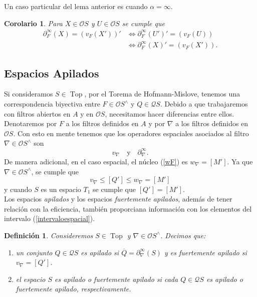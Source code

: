 \documentclass[12pt]{article}
\newtheorem{dfn}[thm]{Definición}
\newtheorem{cor}[thm]{Corolario}
\DeclareMathOperator{\Top}{Top}
\begin{document}
Un caso particular del lema anterior es cuando $\alpha=\infty$.
\begin{cor}\label{cor:infinito}
Para $X\in \mathcal{O}S$ y $U\in \mathcal{O}S$ se cumple que
\begin{equation}\label{eq:infinito}
    \begin{split}
\partial_F^\infty(X)=(v_F(X'))' & \iff \partial_F^\infty(U')'=(v_F(U))\\
& \iff \partial_F^\infty(X)'=(v_F(X')).
    \end{split}
\end{equation}
\end{cor}


\subsection{Espacios Apilados}
Si consideramos $S\in \Top$, por el Torema de Hofmann-Mislove, tenemos una correspondencia biyectiva entre 
$F\in \mathcal{O}S^\wedge$ y $Q\in \mathcal{Q}S$. Debido a que trabajaremos con filtros 
abiertos en $A$ y en $\mathcal{O}S$, necesitamos hacer diferencias entre ellos.\\ 

Denotaremos por $F$ a los filtros definidos en $A$ 
y por $\nabla$ a los filtros definidos en $\mathcal{O}S$.
Con esto en mente tenemos que los operadores espaciales asociados al filtro $\nabla\in \mathcal{O}S^\wedge$ son
\[
v_\nabla\quad\text{y}\quad \partial_\nabla^\infty. 
\]
De manera adicional, en el caso espacial, el núcleo (\ref{wF}) es $w_\nabla=[M']$. Ya que $\nabla\in \mathcal{O}S^\wedge$, se cumple que 
\begin{equation}\label{intervaloespacial}
    v_\nabla\leq [Q']\leq  w_\nabla=[M']
\end{equation}
y cuando $S$ es un espacio $T_1$ se cumple que $[Q']=[M']$.\\

Los espacios \emph{apilados} y los espacios \emph{fuertemente apilados}, además de tener relación con la eficiencia, también proporciana información
con los elementos del intervalo (\ref{intervaloespacial}).

\begin{dfn}\label{def:apilado}
Consideremos $S\in\Top$ y $\nabla\in \mathcal{O}S^\wedge$. Decimos que:
\begin{enumerate}
  \item un conjunto $Q\in \mathcal{Q}S$ es apilado si $\overline{Q}=\partial_\nabla^\infty(S)$ y es fuertemente apilado si $v_\nabla=[Q']$.
  \item el espacio $S$ es apilado o fuertemente apilado si cada $Q\in \mathcal{Q}S$ es apilado o fuertemente apilado, respectivamente.
\end{enumerate}
\end{dfn}
\end{document}
